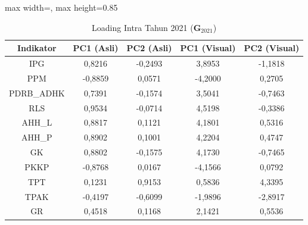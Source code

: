\begin{table}[H]
\centering
\caption{Loading Intra Tahun 2021 ($\mathbf{G}_{2021}$)} \label{tab:app1loading_intra_2021}
\begin{adjustbox}{max width=\textwidth, max height=0.85\textheight}
\begin{tabular}{|c|c|c|c|c|}
\hline
\textbf{Indikator} & \textbf{PC1 (Asli)} & \textbf{PC2 (Asli)} & \textbf{PC1 (Visual)} & \textbf{PC2 (Visual)} \\
\hline
IPG & 0,8216 & -0,2493 & 3,8953 & -1,1818 \\
PPM & -0,8859 & 0,0571 & -4,2000 & 0,2705 \\
PDRB\_ADHK & 0,7391 & -0,1574 & 3,5041 & -0,7463 \\
RLS & 0,9534 & -0,0714 & 4,5198 & -0,3386 \\
AHH\_L & 0,8817 & 0,1121 & 4,1801 & 0,5316 \\
AHH\_P & 0,8902 & 0,1001 & 4,2204 & 0,4747 \\
GK & 0,8802 & -0,1575 & 4,1730 & -0,7465 \\
PKKP & -0,8768 & 0,0167 & -4,1566 & 0,0792 \\
TPT & 0,1231 & 0,9153 & 0,5836 & 4,3395 \\
TPAK & -0,4197 & -0,6099 & -1,9896 & -2,8917 \\
GR & 0,4518 & 0,1168 & 2,1421 & 0,5536 \\
\hline
\end{tabular}
\end{adjustbox}
\end{table}
